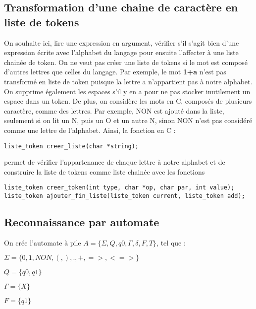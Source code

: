 \documentclass[11pt]{article}
\begin{document}
\subsection{Transformation d'une chaine de caractère en liste de tokens}
On souhaite ici, lire une expression en argument, vérifier s'il s'agit bien d'une expression écrite avec l'alphabet du langage pour ensuite l'affecter à une liste chainée de token. On ne veut pas créer une liste de tokens si le mot est composé d'autres lettres que celles du langage. Par exemple, le mot \textbf{1+a} n'est pas transformé en liste de token puisque la lettre a n'appartient pas à notre alphabet. On supprime également les espaces s'il y en a pour ne pas stocker inutilement un espace dans un token.
De plus, on considère les mots en C, composés de plusieurs caractère, comme des lettres. Par exemple, NON est ajouté dans la liste, seulement si on lit un N, puis un O et un autre N, sinon NON n'est pas considéré comme une lettre de l'alphabet.
Ainsi, la fonction en C :
\begin{verbatim}
liste_token creer_liste(char *string);
\end{verbatim}
permet de vérifier l'appartenance de chaque lettre à notre alphabet et de construire la liste de tokens comme liste chainée avec les fonctions
\begin{verbatim}
liste_token creer_token(int type, char *op, char par, int value);
liste_token ajouter_fin_liste(liste_token current, liste_token add);
\end{verbatim}

\newpage
\subsection{Reconnaissance par automate}
On crée l'automate à pile $A = \{\Sigma,Q,q0,\Gamma,\delta,F,T\}$, tel que :

\noindent $\Sigma = \{0,1,NON,(,),.,+,=>,<=>\}$

\noindent $Q = \{q0,q1\}$

\noindent $\Gamma = \{X\}$

\noindent $F = \{q1\}$
\end{document}
